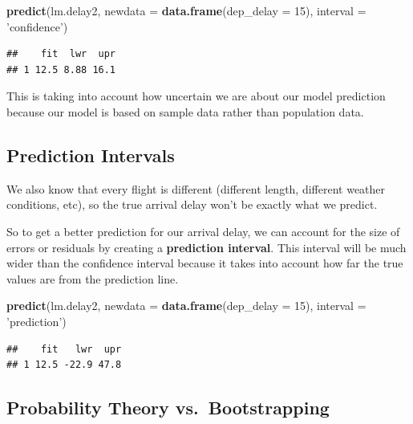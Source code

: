 \documentclass[]{book}
\newenvironment{Shaded}{\begin{snugshade}}{\end{snugshade}}
\newcommand{\DataTypeTok}[1]{\textcolor[rgb]{0.13,0.29,0.53}{#1}}
\newcommand{\DecValTok}[1]{\textcolor[rgb]{0.00,0.00,0.81}{#1}}
\newcommand{\KeywordTok}[1]{\textcolor[rgb]{0.13,0.29,0.53}{\textbf{#1}}}
\newcommand{\NormalTok}[1]{#1}
\newcommand{\StringTok}[1]{\textcolor[rgb]{0.31,0.60,0.02}{#1}}
\begin{document}
\begin{Shaded}
\begin{Highlighting}[]
\KeywordTok{predict}\NormalTok{(lm.delay2, }\DataTypeTok{newdata =} \KeywordTok{data.frame}\NormalTok{(}\DataTypeTok{dep_delay =} \DecValTok{15}\NormalTok{), }\DataTypeTok{interval =} \StringTok{'confidence'}\NormalTok{)}
\end{Highlighting}
\end{Shaded}

\begin{verbatim}
##    fit  lwr  upr
## 1 12.5 8.88 16.1
\end{verbatim}

This is taking into account how uncertain we are about our model prediction because our model is based on sample data rather than population data.

\hypertarget{prediction-intervals}{%
\subsection{Prediction Intervals}\label{prediction-intervals}}

We also know that every flight is different (different length, different weather conditions, etc), so the true arrival delay won't be exactly what we predict.

So to get a better prediction for our arrival delay, we can account for the size of errors or residuals by creating a \textbf{prediction interval}. This interval will be much wider than the confidence interval because it takes into account how far the true values are from the prediction line.

\begin{Shaded}
\begin{Highlighting}[]
\KeywordTok{predict}\NormalTok{(lm.delay2, }\DataTypeTok{newdata =} \KeywordTok{data.frame}\NormalTok{(}\DataTypeTok{dep_delay =} \DecValTok{15}\NormalTok{), }\DataTypeTok{interval =} \StringTok{'prediction'}\NormalTok{)}
\end{Highlighting}
\end{Shaded}

\begin{verbatim}
##    fit   lwr  upr
## 1 12.5 -22.9 47.8
\end{verbatim}

\hypertarget{probability-theory-vs.bootstrapping}{%
\subsection{Probability Theory vs.~Bootstrapping}\label{probability-theory-vs.bootstrapping}}
\end{document}

